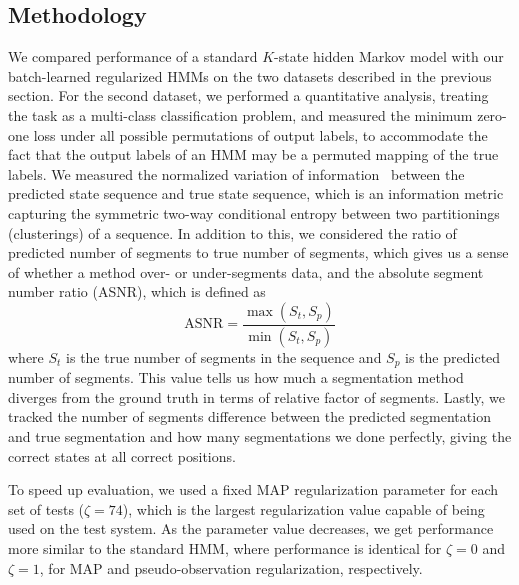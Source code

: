 \documentclass[12pt]{article}
\begin{document}
\subsection{Methodology}

We compared performance of a standard $K$-state hidden Markov model with our batch-learned regularized HMMs on the two datasets described in the previous section. For the second dataset, we performed a quantitative analysis, treating the task as a multi-class classification problem, and measured the minimum zero-one loss under all possible permutations of output labels, to accommodate the fact that the output labels of an HMM may be a permuted mapping of the true labels. We measured the normalized variation of information~\cite{meila} between the predicted state sequence and true state sequence, which is an information metric capturing the symmetric two-way conditional entropy between two partitionings (clusterings) of a sequence.  In addition to this, we considered the ratio of predicted number of segments to true number of segments, which gives us a sense of whether a method over- or under-segments data, and the absolute segment number ratio (ASNR), which is defined as
\[
    \text{ASNR} = \frac{\max(S_t, S_p)}{\min(S_t, S_p)}
\]
where $S_t$ is the true number of segments in the sequence and $S_p$ is the predicted number of segments. This value tells us how much a segmentation method diverges from the ground truth in terms of relative factor of segments. Lastly, we tracked the number of segments difference between the predicted segmentation and true segmentation and how many segmentations we done perfectly, giving the correct states at all correct positions.

To speed up evaluation, we used a fixed MAP regularization parameter for each set of tests ($\zeta = 74$), which is the largest regularization value capable of being used on the test system. As the parameter value decreases, we get performance more similar to the standard HMM, where performance is identical for $\zeta = 0$ and $\zeta = 1$, for MAP and pseudo-observation regularization, respectively.
\end{document}
